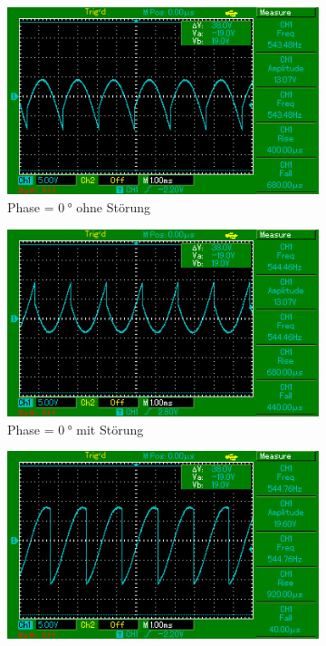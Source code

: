 \begin{figure}[H]
\caption{Phasendiagramme}
\label{fig:3}
    \begin{subfigure}{0.495\linewidth} %
        \centering
        \includegraphics[width=\textwidth]{images/aufg2_phi0.jpg}
        \caption{Phase = $\SI{0}{\degree}$ ohne Störung}
        \label{fig:3a}
    \end{subfigure}
    \begin{subfigure}{0.495\linewidth}
        \centering
        \includegraphics[width=\textwidth]{images/aufg3_phi0.jpg}
        \caption{Phase = $\SI{0}{\degree}$ mit Störung}
        \label{fig:3b}
    \end{subfigure}
    \begin{subfigure}{0.495\linewidth} %
        \centering
        \includegraphics[width=\textwidth]{images/aufg2_phi90.jpg}

\end{subfigure}
\end{figure}
